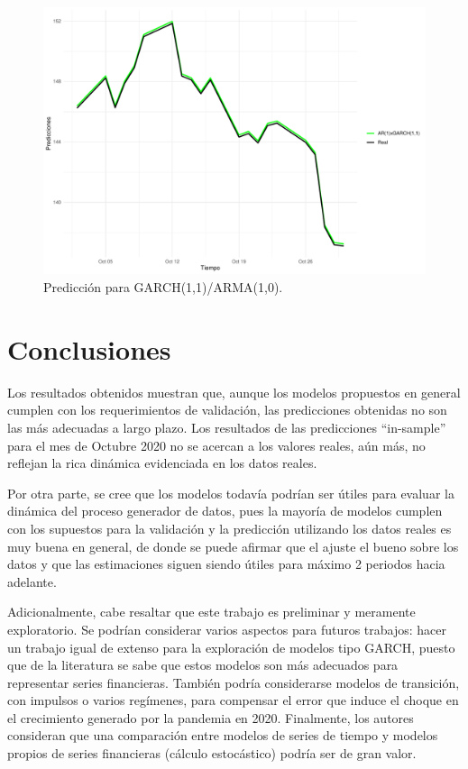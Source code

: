 \documentclass[conference]{IEEEtran}
\begin{document}
\begin{figure}
    \includegraphics[width=\columnwidth]{figs/all5.pdf}
    \caption{Predicción para GARCH(1,1)/ARMA(1,0).}
    \label{fig:pred_data_5}
\end{figure}

\section{Conclusiones}
Los resultados obtenidos muestran que, aunque los modelos propuestos en general cumplen con los requerimientos de validación, las predicciones obtenidas no son las más adecuadas a largo plazo. Los resultados de las predicciones ``in-sample'' para el mes de Octubre 2020 no se acercan a los valores reales, aún más, no reflejan la rica dinámica evidenciada en los datos reales. 

Por otra parte, se cree que los modelos todavía podrían ser útiles para evaluar la dinámica del proceso generador de datos, pues la mayoría de modelos cumplen con los supuestos para la validación y la predicción utilizando los datos reales es muy buena en general, de donde se puede afirmar que el ajuste el bueno sobre los datos y que las estimaciones siguen siendo útiles para máximo 2 periodos hacia adelante.

Adicionalmente, cabe resaltar que este trabajo es preliminar y meramente exploratorio. Se podrían considerar varios aspectos para futuros trabajos: hacer un trabajo igual de extenso para la exploración de modelos tipo GARCH, puesto que de la literatura se sabe que estos modelos son más adecuados para representar series financieras. También podría considerarse modelos de transición, con impulsos o varios regímenes, para compensar el error que induce el choque en el crecimiento generado por la pandemia en 2020. Finalmente, los autores consideran que una comparación entre modelos de series de tiempo y modelos propios de series financieras (cálculo estocástico) podría ser de gran valor.



\end{document}
